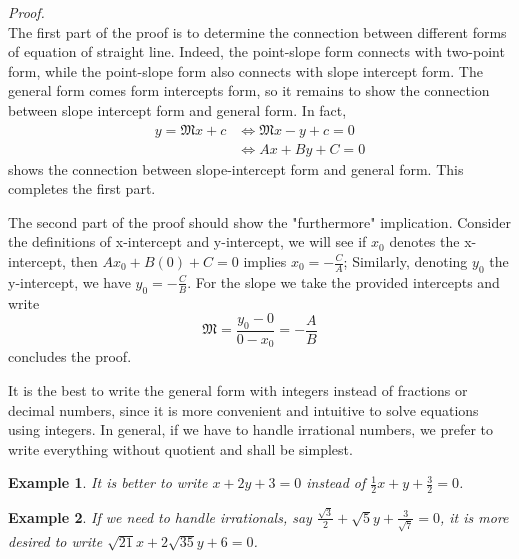 \documentclass[12pt]{article}
\newtheorem*{example}{Example}
\renewenvironment{proof}[1][Proof]{\begin{snugshade*} \textit{{#1}.}\\}{\hfill \qedsymbol \end{snugshade*}}
\begin{document}
    \begin{proof}
        The first part of the proof is to determine the connection between different forms of equation of straight line. Indeed, the point-slope form connects with two-point form, while the point-slope form also connects with slope intercept form. The general form comes form intercepts form, so it remains to show the connection between slope intercept form and general form. In fact, \begin{align*}
            y=\mathfrak{M}x+c &\iff \mathfrak{M}x-y+c=0\\
            &\iff Ax+By+C=0
        \end{align*}
        shows the connection between slope-intercept form and general form. This completes the first part.

        The second part of the proof should show the "furthermore" implication. Consider the definitions of x-intercept and y-intercept, we will see if $x_0$ denotes the x-intercept, then $Ax_0+B(0)+C=0$ implies $x_0=-\frac{C}{A}$; Similarly, denoting $y_0$ the y-intercept, we have $y_0=-\frac{C}{B}$. For the slope we take the provided intercepts and write $$\mathfrak{M}=\frac{y_0-0}{0-x_0}=-\frac{A}{B}$$ concludes the proof.
    \end{proof}

    It is the best to write the general form with integers instead of fractions or decimal numbers, since it is more convenient and intuitive to solve equations using integers. In general, if we have to handle irrational numbers, we prefer to write everything without quotient and shall be simplest.

    \begin{example}
        It is better to write $x+2y+3=0$ instead of $\frac{1}{2}x+y+\frac{3}{2}=0$.
    \end{example}

    \begin{example}
        If we need to handle irrationals, say $\frac{\sqrt{3}}{2}+\sqrt{5}y+\frac{3}{\sqrt{7}}=0$, it is more desired to write $\sqrt{21}x+2\sqrt{35}y+6=0$.
    \end{example}
\end{document}
